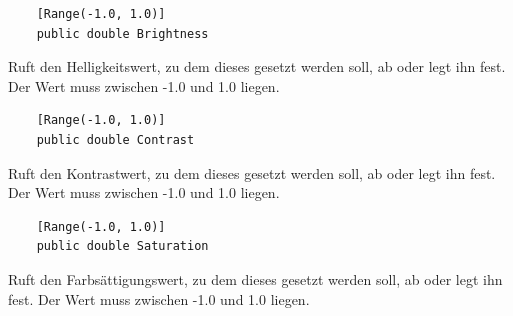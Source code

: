 \begin{itemize}

	\begin{verbatim}
	[Range(-1.0, 1.0)]
	public double Brightness
	\end{verbatim}
	Ruft den Helligkeitswert, zu dem dieses  gesetzt werden soll, ab oder legt ihn fest. Der Wert muss zwischen -1.0 und 1.0 liegen.
	
	\begin{verbatim}
	[Range(-1.0, 1.0)]
	public double Contrast
	\end{verbatim}
	Ruft den Kontrastwert, zu dem dieses  gesetzt werden soll, ab oder legt ihn fest. Der Wert muss zwischen -1.0 und 1.0 liegen.
	
	\begin{verbatim}
	[Range(-1.0, 1.0)]
	public double Saturation
	\end{verbatim}
	Ruft den Farbsättigungswert, zu dem dieses  gesetzt werden soll, ab oder legt ihn fest. Der Wert muss zwischen -1.0 und 1.0 liegen.


\end{itemize}
